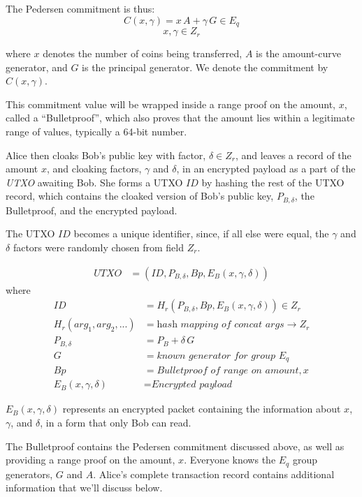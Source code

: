 \documentclass[a4paper, 10pt, conference]{ieeeconf}
\begin{document}
The Pedersen commitment is thus:
$$ C(x, \gamma) = x \, A + \gamma \, G \in E_q$$
$$x, \gamma \in Z_r$$

where $x$ denotes the number of coins being transferred, $A$ is the amount-curve generator, and $G$ is the principal generator. We denote the commitment by $C(x, \gamma)$. 

This commitment value will be wrapped inside a range proof on the amount, $x$, called a ``Bulletproof'', which also proves that the amount lies within a legitimate range of values, typically a 64-bit number.

Alice then cloaks Bob's public key with factor, $\delta \in Z_r$, and leaves a record of the amount $x$, and cloaking factors, $\gamma$ and $\delta$, in an encrypted payload as a part of the \textit{UTXO} awaiting Bob. She forms a UTXO $\mathit{ID}$ by hashing the rest of the UTXO record, which contains the cloaked version of Bob's public key, $P_{B, \delta}$, the Bulletproof, and the encrypted payload. 

The UTXO $\mathit{ID}$ becomes a unique identifier, since, if all else were equal, the $\gamma$ and $\delta$ factors were randomly chosen from field $Z_r$.

\begin{align*}
UTXO &= (ID, P_{B, \delta}, Bp, E_B(x, \gamma, \delta))
\end{align*}
where
\begin{align*}
ID &= H_r(P_{B, \delta}, Bp, E_B(x, \gamma, \delta)) \in Z_r \\
H_r(arg_1, arg_2, ...) &= \textit{hash mapping of concat args} \rightarrow Z_r \\
P_{B, \delta} &= P_B + \delta \, G \\
G &= \textit{known generator for group } E_q \\
Bp &= \textit{Bulletproof of range on amount}, x \\
E_B(x, \gamma, \delta) &= \textit{Encrypted payload}
\end{align*}

$E_B(x, \gamma, \delta)$ represents an encrypted packet containing the information about $x$, $\gamma$, and $\delta$, in a form that only Bob can read.

The Bulletproof contains the Pedersen commitment discussed above, as well as providing a range proof on the amount, $x$. Everyone knows the $E_q$ group generators, $G$ and $A$. Alice's complete transaction record contains additional information that we'll discuss below.
\end{document}
